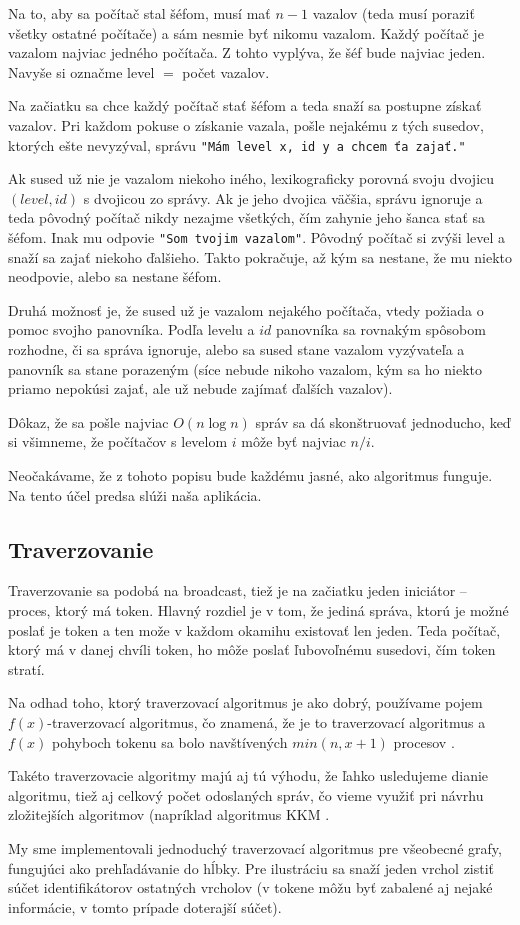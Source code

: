 Na to, aby sa počítač stal šéfom, musí mať $n-1$ vazalov (teda musí
poraziť všetky ostatné počítače) a sám nesmie byť nikomu vazalom. Každý počítač je vazalom najviac 
jedného počítača. Z tohto vyplýva, že šéf bude najviac jeden. Navyše si označme level $=$ počet vazalov.

Na začiatku sa chce každý počítač stať šéfom a teda snaží sa postupne získať vazalov. Pri každom
pokuse o získanie vazala, pošle nejakému z tých susedov, ktorých ešte nevyzýval, správu \verb!"Mám level x, id y a chcem ťa zajať."! 

Ak sused už nie je vazalom niekoho iného, lexikograficky porovná svoju dvojicu $(level, id)$ s
dvojicou zo správy. 
Ak je jeho dvojica väčšia, správu ignoruje a teda pôvodný počítač nikdy nezajme všetkých, čím
zahynie jeho šanca stať sa šéfom. 
Inak mu odpovie \verb!"Som tvojim vazalom"!. Pôvodný počítač si zvýši level a snaží sa zajať niekoho
ďalšieho. Takto pokračuje, až kým sa nestane, že mu niekto neodpovie, alebo sa nestane šéfom.

Druhá možnosť je, že sused už je vazalom nejakého počítača, vtedy požiada o pomoc svojho panovníka.
Podľa levelu a $id$ panovníka sa rovnakým spôsobom rozhodne, či sa správa ignoruje, alebo 
sa sused stane vazalom vyzývateľa a panovník sa stane porazeným (síce nebude nikoho vazalom, kým sa
ho niekto priamo nepokúsi zajať, ale už nebude zajímať ďalších vazalov).

Dôkaz, že sa pošle najviac $O(n\log n)$ správ sa dá skonštruovať jednoducho, keď si všimneme, 
že počítačov s levelom $i$ môže byť najviac $n/i$.
\cite{korach1984}
 
Neočakávame, že z tohoto popisu bude každému jasné, ako algoritmus funguje. Na tento účel predsa
slúži naša aplikácia.

\subsection{Traverzovanie}

Traverzovanie sa podobá na broadcast, tiež je na začiatku jeden iniciátor -- proces, ktorý má token.
Hlavný rozdiel je  v tom, že jediná správa, ktorú je možné poslať je token a ten može v každom
okamihu existovať len jeden. Teda počítač, ktorý má v danej chvíli token, ho môže poslať ľubovoľnému
susedovi, čím token stratí.

Na odhad toho, ktorý traverzovací algoritmus je ako dobrý, používame pojem $f(x)$-traverzovací
algoritmus, čo znamená, že je to traverzovací algoritmus a $f(x)$ pohyboch tokenu sa bolo
navštívených $min(n, x+1)$ procesov \cite{tel2000}.

Takéto traverzovacie algoritmy majú aj tú výhodu, že ľahko usledujeme dianie algoritmu, tiež aj celkový počet odoslaných
správ, čo vieme využiť pri návrhu zložitejších algoritmov (napríklad algoritmus
KKM \cite{korach1990}.

My sme implementovali jednoduchý traverzovací algoritmus pre všeobecné grafy, fungujúci ako 
prehľadávanie do hĺbky. Pre ilustráciu sa snaží jeden vrchol zistiť súčet identifikátorov ostatných
vrcholov (v tokene môžu byť zabalené aj nejaké informácie, v tomto prípade doterajší súčet).






